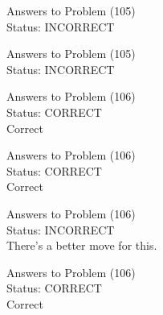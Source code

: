 \documentclass[11pt]{article}
\begin{document}
\begin{minipage}[t]{0.5\textwidth}
  {\centering
  
  Answers to Problem (105)\\
  Status: INCORRECT\\
  
  }
\end{minipage}
\begin{minipage}[t]{0.5\textwidth}
  {\centering
  
  Answers to Problem (105)\\
  Status: INCORRECT\\
  
  }
\end{minipage}
\begin{minipage}[t]{0.5\textwidth}
  {\centering
  
  Answers to Problem (106)\\
  Status: CORRECT\\
  Correct\\
  }
\end{minipage}
\begin{minipage}[t]{0.5\textwidth}
  {\centering
  
  Answers to Problem (106)\\
  Status: CORRECT\\
  Correct\\
  }
\end{minipage}
\begin{minipage}[t]{0.5\textwidth}
  {\centering
  
  Answers to Problem (106)\\
  Status: INCORRECT\\
  There's a better move for this.\\
  }
\end{minipage}
\begin{minipage}[t]{0.5\textwidth}
  {\centering
  
  Answers to Problem (106)\\
  Status: CORRECT\\
  Correct\\
  }
\end{minipage}
\end{document}
